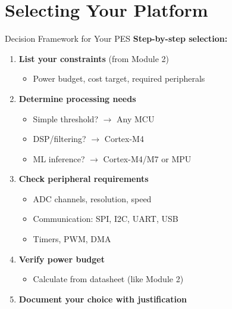 \documentclass[aspectratio=169,11pt]{beamer}
\begin{document}
\section{Selecting Your Platform}

\begin{frame}{Decision Framework for Your PES}
    \textbf{Step-by-step selection:}
    
    \vspace{0.3cm}
    \begin{enumerate}
        \item \textbf{List your constraints} (from Module 2)
        \begin{itemize}
            \item Power budget, cost target, required peripherals
        \end{itemize}
        
        \item \textbf{Determine processing needs}
        \begin{itemize}
            \item Simple threshold? $\rightarrow$ Any MCU
            \item DSP/filtering? $\rightarrow$ Cortex-M4
            \item ML inference? $\rightarrow$ Cortex-M4/M7 or MPU
        \end{itemize}
        
        \item \textbf{Check peripheral requirements}
        \begin{itemize}
            \item ADC channels, resolution, speed
            \item Communication: SPI, I2C, UART, USB
            \item Timers, PWM, DMA
        \end{itemize}
        
        \item \textbf{Verify power budget}
        \begin{itemize}
            \item Calculate from datasheet (like Module 2)
        \end{itemize}
        
        \item \textbf{Document your choice with justification}
    \end{enumerate}
\end{frame}
\end{document}
